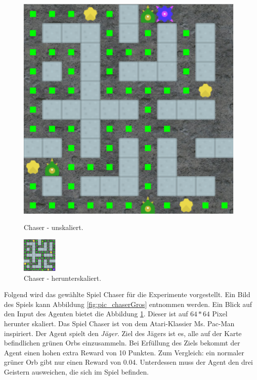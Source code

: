 \begin{figure}[bp!]

   \captionsetup{width=0.45\linewidth} 
    \centering
    \begin{minipage}{0.45\linewidth}
        \centering
        \includegraphics[scale=0.3]{abb/ss_chaser_gros}
        \caption{Chaser - unskaliert.}
        \label{fig:pic_chaserGros}
    \end{minipage}
    \begin{minipage}{0.45\linewidth}
        \centering
        \includegraphics[scale=2.35]{abb/ss_chaser_klein}
        \caption{Chaser - herunterskaliert.}
        \label{fig:pic_chaserKlein}
    \end{minipage}
\end{figure}


Folgend wird das gewählte Spiel Chaser für die Experimente vorgestellt. Ein Bild des Spiels kann Abbildung \ref{fig:pic_chaserGros} entnommen werden. Ein Blick auf den Input des Agenten bietet die Abbildung \ref{fig:pic_chaserKlein}. Dieser ist auf $64 * 64$ Pixel herunter skaliert. 
Das Spiel Chaser ist von dem Atari-Klassier \dq Ms. Pac-Man\dq{} inspiriert. Der Agent spielt den \emph{Jäger}. Ziel des Jägers ist es, alle auf der Karte befindlichen grünen Orbs einzusammeln. Bei Erfüllung des Ziels bekommt der Agent einen hohen extra Reward von 10 Punkten. Zum Vergleich: ein normaler grüner Orb gibt nur einen Reward von 0.04. Unterdessen muss der Agent den drei Geistern ausweichen, die sich im Spiel befinden.

